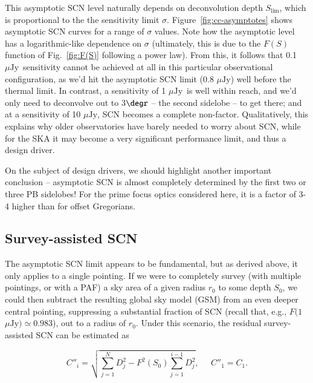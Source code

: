 \documentclass{aa}
\newcommand{\uJy}{$\mu\mathrm{Jy}$}
\begin{document}
This asymptotic SCN level naturally depends on deconvolution depth $S_{\lim}$, which is proportional to the the sensitivity limit $\sigma$. Figure~\ref{fig:cc-asymptotes} shows asymptotic SCN curves for a range of $\sigma$ values. Note how the asymptotic level has a logarithmic-like dependence on $\sigma$ (ultimately, this is due to the $F(S)$ function of Fig.~\ref{fig:F(S)} following a power law). From this, it follows that 0.1 \uJy\ sensitivity cannot be achieved at all in this particular observational configuration, as we'd hit the asymptotic SCN limit (0.8 \uJy) well before the thermal limit. In contrast, a sensitivity of 1 \uJy\ is well within reach, and we'd only need to deconvolve out to 3$\degr$ -- the second sidelobe -- to get there; and at a sensitivity of 10 \uJy, SCN becomes a complete non-factor. Qualitatively, this explains why older observatories have barely needed to worry about SCN, while for the SKA it may become a very significant performance limit, and thus a design driver.

On the subject of design drivers, we should highlight another important conclusion -- asymptotic SCN is almost completely determined by the first two or three PB sidelobes! For the prime focus optics considered here, it is a factor of 3-4 higher than for offset Gregorians.

\subsection{Survey-assisted SCN}

The asymptotic SCN limit appears to be fundamental, but as derived above, it only applies to a single pointing. If we were to completely survey (with multiple pointings, or with a PAF) a sky area of a given radius $r_0$ to some depth $S_0$, we could then subtract the resulting global sky model (GSM) from an even deeper central pointing, suppressing a substantial fraction of SCN (recall that, e.g., $F(1$\uJy$)\simeq0.983$), out to a radius of $r_0$. Under this scenario, the residual survey-assisted SCN can be estimated as

\[
  C''_i = \sqrt{ \sum_{j=1}^{N} D^2_j - F^2(S_0) \sum_{j=1}^{i-1} D_j^2 }, \;\;\;\;\; C''_1=C_1.
\]
\end{document}
